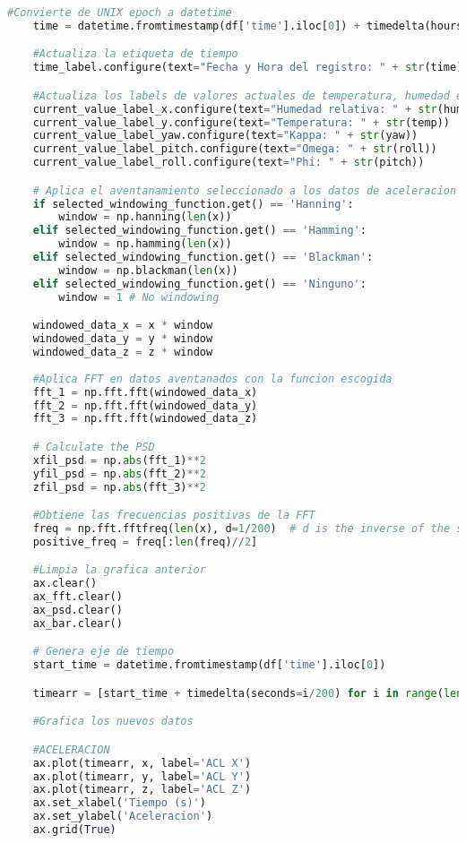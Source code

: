 \begin{lstlisting}[language=Python, caption=Código para interfaz gráfica de control y monitoreo]
    #Convierte de UNIX epoch a datetime
    time = datetime.fromtimestamp(df['time'].iloc[0]) + timedelta(hours=4) #Diferencia de 4 horas por GMT

    #Actualiza la etiqueta de tiempo
    time_label.configure(text="Fecha y Hora del registro: " + str(time))

    #Actualiza los labels de valores actuales de temperatura, humedad e inclinacion
    current_value_label_x.configure(text="Humedad relativa: " + str(hum) + "%")
    current_value_label_y.configure(text="Temperatura: " + str(temp))
    current_value_label_yaw.configure(text="Kappa: " + str(yaw))
    current_value_label_pitch.configure(text="Omega: " + str(roll))
    current_value_label_roll.configure(text="Phi: " + str(pitch))

    # Aplica el aventanamiento seleccionado a los datos de aceleracion
    if selected_windowing_function.get() == 'Hanning':
        window = np.hanning(len(x))
    elif selected_windowing_function.get() == 'Hamming':
        window = np.hamming(len(x))
    elif selected_windowing_function.get() == 'Blackman':
        window = np.blackman(len(x))
    elif selected_windowing_function.get() == 'Ninguno':
        window = 1 # No windowing

    windowed_data_x = x * window
    windowed_data_y = y * window
    windowed_data_z = z * window
    
    #Aplica FFT en datos aventanados con la funcion escogida
    fft_1 = np.fft.fft(windowed_data_x)
    fft_2 = np.fft.fft(windowed_data_y)
    fft_3 = np.fft.fft(windowed_data_z)

    # Calculate the PSD
    xfil_psd = np.abs(fft_1)**2
    yfil_psd = np.abs(fft_2)**2
    zfil_psd = np.abs(fft_3)**2

    #Obtiene las frecuencias positivas de la FFT
    freq = np.fft.fftfreq(len(x), d=1/200)  # d is the inverse of the sampling rate
    positive_freq = freq[:len(freq)//2]

    #Limpia la grafica anterior
    ax.clear()
    ax_fft.clear()
    ax_psd.clear()
    ax_bar.clear()

    # Genera eje de tiempo
    start_time = datetime.fromtimestamp(df['time'].iloc[0])

    timearr = [start_time + timedelta(seconds=i/200) for i in range(len(x))]

    #Grafica los nuevos datos

    #ACELERACION
    ax.plot(timearr, x, label='ACL X')
    ax.plot(timearr, y, label='ACL Y')
    ax.plot(timearr, z, label='ACL Z')
    ax.set_xlabel('Tiempo (s)')
    ax.set_ylabel('Aceleracion')
    ax.grid(True)


\end{lstlisting}
